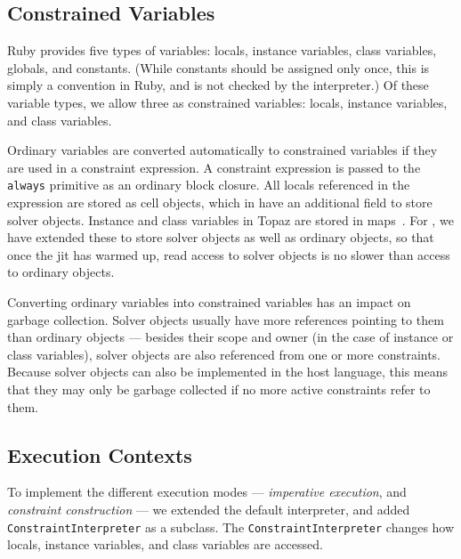\subsection{Constrained Variables}
\label{sec:constrained-variables-impl}
Ruby provides five types of variables: locals, instance variables,
class variables, globals, and constants.  (While constants should be
assigned only once, this is simply a convention in Ruby, and is not
checked by the interpreter.)  Of these variable types, we allow three
as constrained variables: locals, instance variables, and class
variables.

Ordinary variables are converted automatically to constrained variables 
if they are used in a
constraint expression. A constraint expression is passed to the
\lstinline{always} primitive as an ordinary block closure. All locals
referenced in the expression are stored as cell objects, which in
\toolname have an additional field to store solver objects. Instance
and class variables in Topaz are stored in
maps~\cite{chambers1989efficient}. For \toolname, we have extended
these to store solver objects as well as ordinary objects, so that
once the \ac{jit} has warmed up, read access to solver objects is no
slower than access to ordinary objects.

Converting ordinary variables into constrained variables has an impact
on garbage collection.  Solver objects usually have more references
pointing to them than ordinary objects --- besides their scope and
owner (in the case of instance or class variables), solver objects are
also referenced from one or more constraints. Because solver objects
can also be implemented in the host language, this means that they may
only be garbage collected if no more active constraints refer to them.

\subsection{Execution Contexts}
\label{sec:constraint-construction-impl}

To implement the different execution modes --- \emph{imperative
  execution}, and \emph{constraint construction} --- we extended the
default interpreter, and added \lstinline{ConstraintInterpreter} as a
subclass. The \lstinline{ConstraintInterpreter} changes how locals,
instance variables, and class variables are accessed.

